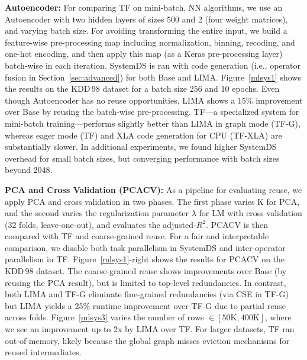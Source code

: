\textbf{Autoencoder:} For comparing TF on mini-batch, NN algorithms, we use an Autoencoder with two hidden layers of sizes 500 and 2 (four weight matrices), and varying batch size. For avoiding transforming the entire input, we build a feature-wise pre-processing map including normalization, binning, recoding, and one-hot encoding, and then apply this map (as a Keras pre-processing layer) batch-wise in each iteration. SystemDS is ran with code generation (i.e., operator fusion in Section~\ref{sec:advanced}) for both Base and LIMA.
Figure~\ref{mlsys1} shows the results on the KDD\,98 dataset for a batch size 256 and 10 epochs. Even though Autoencoder has no reuse opportunities, LIMA shows a 15\% improvement over Base by reusing the batch-wise pre-processing. TF---a specialized system for mini-batch training---performs slightly better than LIMA in graph mode (TF-G), whereas eager mode (TF) and XLA code generation for CPU (TF-XLA) are substantially slower. In additional experiments, we found higher SystemDS overhead for small batch sizes, but converging performance with batch sizes beyond \num{2048}.

\textbf{PCA and Cross Validation (PCACV):} As a pipeline for evaluating reuse, we apply PCA and cross validation in two phases. The first phase varies K for PCA, and the second varies the regularization parameter $\lambda$ for LM with cross validation (32 folds, leave-one-out), and evaluates the adjusted-$R^{2}$. PCACV is then compared with TF and coarse-grained reuse. For a fair and interpretable comparison, we disable both task parallelism in SystemDS and inter-operator parallelism in TF. Figure~\ref{mlsys1}-right shows the results for PCACV on the KDD\,98 dataset. The coarse-grained reuse shows improvements over Base (by reusing the PCA result), but is limited to top-level redundancies. In contrast, both LIMA and TF-G eliminate fine-grained redundancies (via CSE in TF-G) but LIMA yields a 25\% runtime improvement over TF-G due to partial reuse across folds. Figure~\ref{mlsys3} varies the number of rows $\in [50\text{K}, 400\text{K}]$, where we see an improvement up to 2x by LIMA over TF. For larger datasets, TF ran out-of-memory, likely because the global graph misses eviction mechanisms for reused intermediates.

